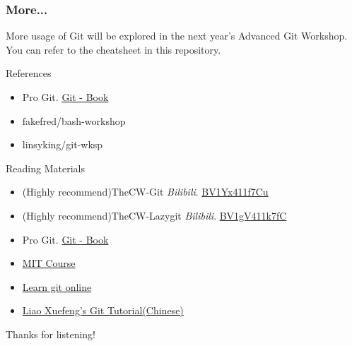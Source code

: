 \documentclass[aspectratio=169]{beamer}
\begin{document}
\begin{frame}
  \frametitle{More...}
  More usage of Git will be explored in the next year's Advanced Git Workshop. You can refer to the cheatsheet in this repository.
\end{frame}


\begin{frame}{References}
  \begin{itemize}
      \item Pro Git. \href{https://git-scm.com/book/en/v2}{Git - Book}
      \item fakefred/bash-workshop
      \item linsyking/git-wksp
  \end{itemize}
\end{frame}

\begin{frame}{Reading Materials}
  \begin{itemize}
      \item (Highly recommend)TheCW-Git \emph{Bilibili}. \href{https://www.bilibili.com/video/BV1Yx411f7Cu}{BV1Yx411f7Cu}
      \item (Highly recommend)TheCW-Lazygit \emph{Bilibili}. \href{https://www.bilibili.com/video/BV1gV411k7fC}{BV1gV411k7fC}
      \item Pro Git. \href{https://git-scm.com/book/en/v2}{Git - Book}
      \item \href{https://missing.csail.mit.edu/2020/course-shell/}{MIT Course}
      \item \href{https://learngitbranching.js.org/?locale=zh_CN}{Learn git online}
      \item \href{https://www.liaoxuefeng.com/wiki/896043488029600}{Liao Xuefeng's Git Tutorial(Chinese)}
  \end{itemize}
\end{frame}

\begin{frame}
  \Huge{\textcolor{UMBlue}{Thanks for listening!}}
\end{frame}
\end{document}
